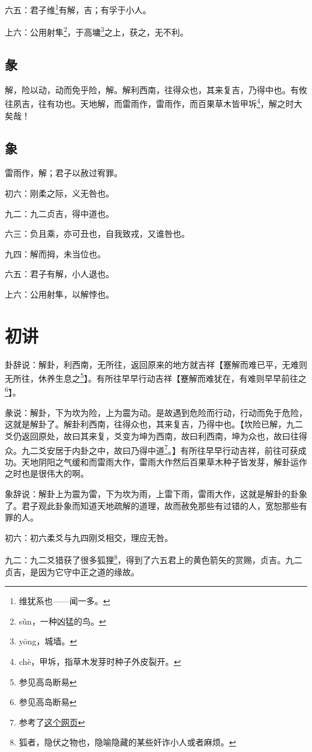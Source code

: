 \documentclass[12pt,oneside]{book}
\begin{document}
六五：君子维\footnote{维犹系也——闻一多。}有解，吉；有孚于小人。

上六：公用射隼\footnote{sǔn，一种凶猛的鸟。}，于高墉\footnote{yōng，城墙。}之上，获之，无不利。

\subsection{彖}
解，险以动，动而免乎险，解。解利西南，往得众也，其来复吉，乃得中也。有攸往夙吉，往有功也。天地解，而雷雨作，雷雨作，而百果草木皆甲坼\footnote{chè，甲坼，指草木发芽时种子外皮裂开。}，解之时大矣哉！

\subsection{象}
雷雨作，解；君子以赦过宥罪。

初六：刚柔之际，义无咎也。

九二：九二贞吉，得中道也。

六三：负且乘，亦可丑也，自我致戎，又谁咎也。

九四：解而拇，未当位也。

六五：君子有解，小人退也。

上六：公用射隼，以解悖也。

\section{初讲}
卦辞说：解卦，利西南，无所往，返回原来的地方就吉祥【蹇解而难已平，无难则无所往，休养生息之\footnote{参见高岛断易}】。有所往早早行动吉祥【蹇解而难犹在，有难则早早前往之\footnote{参见高岛断易}】。

彖说：解卦，下为坎为险，上为震为动。是故遇到危险而行动，行动而免于危险，这就是解卦了。解卦利西南，往得众也，其来复吉，乃得中也。【坎险已解，九二爻仍返回原处，故曰其来复，爻变为坤为西南，故曰利西南，坤为众也，故曰往得众。九二爻安居于内卦之中，故曰乃得中道\footnote{参考了\href{https://www.eee-learning.com/book/neweee40}{这个网页}}。】有所往早早行动吉祥，前往可获成功。天地阴阳之气缓和而雷雨大作，雷雨大作然后百果草木种子皆发芽，解卦运作之时也是很伟大的啊。

象辞说：解卦上为震为雷，下为坎为雨，上雷下雨，雷雨大作，这就是解卦的卦象了。君子观此卦象而知道天地疏解的道理，故而赦免那些有过错的人，宽恕那些有罪的人。


初六：初六柔爻与九四刚爻相交，理应无咎。

九二：九二爻猎获了很多狐狸\footnote{狐者，隐伏之物也，隐喻隐藏的某些奸诈小人或者麻烦。}，得到了六五君上的黄色箭矢的赏赐，贞吉。九二贞吉，是因为它守中正之道的缘故。
\end{document}
